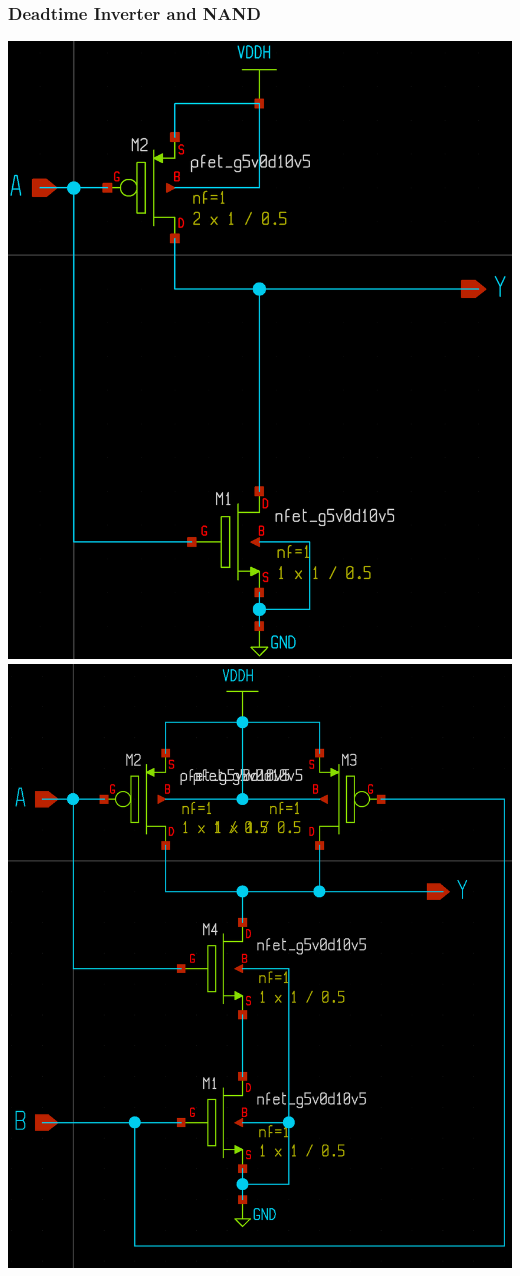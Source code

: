 \documentclass{beamer}
\begin{document}
\begin{frame}
  \frametitle{Deadtime Inverter and NAND}
  \begin{multicols}{2}
    \includegraphics[scale=0.09]{inverter.png}
    \columnbreak
    \includegraphics[scale=0.107]{nand.png}

\end{multicols}
\end{frame}
\end{document}
